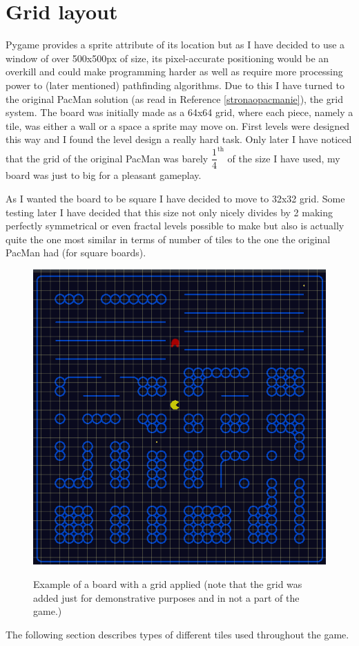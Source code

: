 \documentclass[11pt,a4paper]{report}
\newenvironment{img}{
	\begin{center}
		\begin{figure}
			\begin{center}
			
}{
	\end{center}
		\end{figure}
			\end{center}
}
\begin{document}
		\section{Grid layout}
			Pygame provides a sprite attribute of its location but as I have decided to use a window of over 500x500px of size, its pixel-accurate positioning would be an overkill and could make programming harder as well as require more processing power to (later mentioned) pathfinding algorithms.
			Due to this I have turned to the original PacMan solution (as read in Reference \ref{stronaopacmanie}), the grid system. The board was initially made as a 64x64 grid, where each piece, namely a tile, was either a wall or a space a sprite may move on. First levels were designed this way and I found the level design a really hard task. Only later I have noticed that the grid of the original PacMan was barely $\dfrac{1}{4}^{\text{th}}$ of the size I have used, my board was just to big for a pleasant gameplay.
			
			As I wanted the board to be square I have decided to move to 32x32 grid. Some testing later I have decided that this size not only nicely divides by 2 making perfectly symmetrical or even fractal levels possible to make but also is actually quite the one most similar in terms of number of tiles to the one the original PacMan had (for square boards).
			\begin{img}
				\includegraphics[width=350pt]{images/board_grid}\\
				\caption{Example of a board with a grid applied (note that the grid was added just for demonstrative purposes and in not a part of the game.)}
			\end{img}
			The following section describes types of different tiles used throughout the game.
\end{document}

